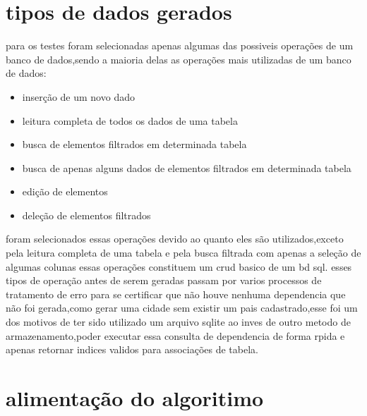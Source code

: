 \documentclass[
	12pt,				%
	openright,			%
	oneside,			%
	a4paper,			%
	english,			%
	french,				%
	spanish,			%
	brazil,				%
	]{abntex2}
\begin{document}
\section{tipos de dados gerados}
\label{sec:tipos de dados gerados}
para os testes foram selecionadas apenas algumas das possiveis operações de um banco de dados,sendo a maioria delas as operações mais utilizadas de um banco de dados:
\begin{itemize}
\item inserção de um novo dado
\item leitura completa de todos os dados de uma tabela
\item busca de elementos filtrados em determinada tabela
\item busca de apenas alguns dados de elementos filtrados em determinada tabela
\item edição de elementos
\item deleção de elementos filtrados
\end{itemize}
foram selecionados essas operações devido ao quanto eles são utilizados,exceto pela leitura completa de uma tabela e pela busca filtrada com apenas a seleção de algumas colunas essas operações constituem um crud basico de um bd sql.\newline
esses tipos de operação antes de serem geradas passam por varios processos de tratamento de erro para se certificar que não houve nenhuma dependencia que não foi gerada,como gerar uma cidade sem existir um pais cadastrado,esse foi um dos motivos de ter sido utilizado um arquivo sqlite ao inves de outro metodo de armazenamento,poder executar essa consulta de dependencia de forma rpida e apenas retornar indices validos para associações de tabela.

\section{alimentação do algoritimo}
\label{sec:alimentação do algoritimo}
\end{document}
